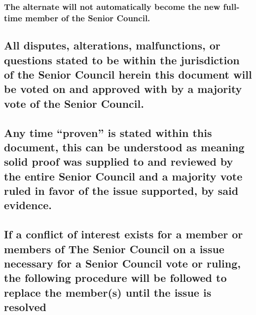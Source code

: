 \documentclass[]{book}
\begin{document}
\hypertarget{the-alternate-will-not-automatically-become-the-new-full-time-member-of-the-senior-council.}{%
\subsubsection{The alternate will not automatically become the new full-time member of the Senior Council.}\label{the-alternate-will-not-automatically-become-the-new-full-time-member-of-the-senior-council.}}

\hypertarget{all-disputes-alterations-malfunctions-or-questions-stated-to-be-within-the-jurisdiction-of-the-senior-council-herein-this-document-will-be-voted-on-and-approved-with-by-a-majority-vote-of-the-senior-council.}{%
\subsection{All disputes, alterations, malfunctions, or questions stated to be within the jurisdiction of the Senior Council herein this document will be voted on and approved with by a majority vote of the Senior Council.}\label{all-disputes-alterations-malfunctions-or-questions-stated-to-be-within-the-jurisdiction-of-the-senior-council-herein-this-document-will-be-voted-on-and-approved-with-by-a-majority-vote-of-the-senior-council.}}

\hypertarget{any-time-proven-is-stated-within-this-document-this-can-be-understood-as-meaning-solid-proof-was-supplied-to-and-reviewed-by-the-entire-senior-council-and-a-majority-vote-ruled-in-favor-of-the-issue-supported-by-said-evidence.}{%
\subsection{Any time ``proven'' is stated within this document, this can be understood as meaning solid proof was supplied to and reviewed by the entire Senior Council and a majority vote ruled in favor of the issue supported, by said evidence.}\label{any-time-proven-is-stated-within-this-document-this-can-be-understood-as-meaning-solid-proof-was-supplied-to-and-reviewed-by-the-entire-senior-council-and-a-majority-vote-ruled-in-favor-of-the-issue-supported-by-said-evidence.}}

\hypertarget{if-a-conflict-of-interest-exists-for-a-member-or-members-of-the-senior-council-on-a-issue-necessary-for-a-senior-council-vote-or-ruling-the-following-procedure-will-be-followed-to-replace-the-members-until-the-issue-is-resolved}{%
\subsection{If a conflict of interest exists for a member or members of The Senior Council on a issue necessary for a Senior Council vote or ruling, the following procedure will be followed to replace the member(s) until the issue is resolved}\label{if-a-conflict-of-interest-exists-for-a-member-or-members-of-the-senior-council-on-a-issue-necessary-for-a-senior-council-vote-or-ruling-the-following-procedure-will-be-followed-to-replace-the-members-until-the-issue-is-resolved}}
\end{document}
